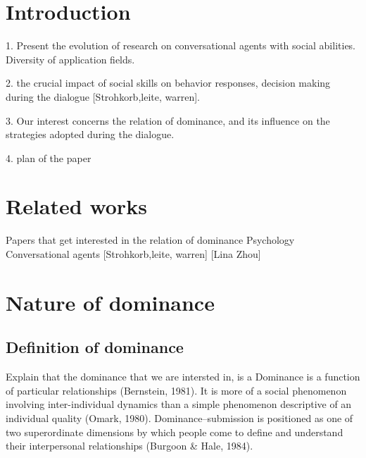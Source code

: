 \documentclass{llncs}
\begin{document}
\title{\vskip -10pt}

\author{Lydia Ould Ouali, Charles Rich \and
Nicolas Sabouret }

\maketitle 
\begin{abstract}\vskip -20pt
  
\end{abstract}

\section{Introduction}
	1. Present the evolution of research on conversational agents with social abilities. Diversity of application fields.
	
	
	2. the crucial impact of social skills on behavior responses, decision making during the  dialogue [Strohkorb,leite, warren].
	
	3. Our interest concerns the relation of dominance, and its influence on the strategies adopted during the dialogue. 
	
	4. plan of the paper 

\section{Related works}

Papers that get interested in the relation of dominance  
	Psychology
	Conversational agents [Strohkorb,leite, warren] \cite{BickmoreEtAl2010}[Lina Zhou]

\section{Nature of dominance}

\subsection{Definition of dominance}
	Explain that the dominance that we are intersted in, is a Dominance is a function of particular relationships (Bernstein, 1981). It is more of 	a social phenomenon involving inter-individual dynamics than a simple phenomenon descriptive of an individual quality (Omark, 1980). Dominance–submission is
	positioned as one of two superordinate dimensions by which people come to define and understand their interpersonal relationships (Burgoon \& Hale, 1984).
\end{document}
